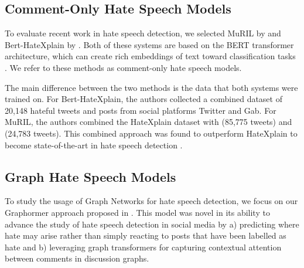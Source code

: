 \documentclass[letterpaper]{article} %
\begin{document}
\subsection{Comment-Only Hate Speech Models}
To evaluate recent work in hate speech detection, we selected MuRIL by \citet{das2022data} and Bert-HateXplain by \citet{mathew2021hatexplain}. Both of these systems are based on the BERT transformer architecture, which can create rich embeddings of text toward classification tasks \cite{devlin2019bert}. We refer to these methods as comment-only hate speech models.

The main difference between the two methods is the data that both systems were trained on. For Bert-HateXplain, the authors collected a combined dataset of 20,148 hateful tweets and posts from social platforms Twitter and Gab. For MuRIL, the authors combined the HateXplain dataset with \citet{founta2018large} (85,775 tweets) and \citet{davidson2017automated} (24,783 tweets). This combined approach was found to outperform HateXplain to become state-of-the-art in hate speech detection \cite{das2022data}.

\subsection{Graph Hate Speech Models}
To study the usage of Graph Networks for hate speech detection, we focus on our Graphormer approach proposed in \citet{hebert2022predicting}. This model was novel in its ability to advance the study of hate speech detection in social media by a) predicting where hate may arise rather than simply reacting to posts that have been labelled as hate and b) leveraging graph transformers for capturing contextual attention between comments in discussion graphs.
\end{document}
